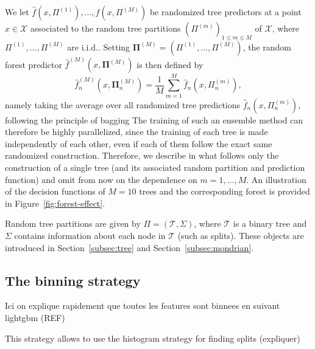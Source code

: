 \documentclass{article}
\makeatletter
\renewcommand{\leq}{\leqslant}
\renewcommand{\geq}{\geqslant}
\newcommand{\cX}{\mathcal X}
\newcommand{\iid}{i.i.d.\@\xspace}
\newcommand{\splits}{\Sigma} %
\newcommand{\tree}{\mathcal{T}} %
\newcommand{\nbtrees}{M} %
\makeatother
\begin{document}
We let $\widehat f(x, \Pi^{(1)}), \dots, \widehat f(x, \Pi^{(M)})$ be randomized tree predictors at a point $x \in \cX$ associated to the random tree partitions $(\Pi^{(m)})_{1 \leq m \leq M}$  of $\cX$, where $\Pi^{(1)}, \hdots , \Pi^{(M)}$ are \iid.
Setting $\boldsymbol \Pi^{(M)} = (\Pi^{(1)}, \ldots, \Pi^{(M)})$, the random forest predictor $\widehat f^{(\nbtrees)}(x, \boldsymbol \Pi^{(M)})$ is then defined by
\begin{equation}
    \label{eq:def_RF}
    \widehat f_n^{(M)}(x, \boldsymbol \Pi_n^{(M)}) = \frac 1M \sum_{m=1}^M \widehat f_n(x, \Pi_n^{(m)}),
\end{equation}
namely taking the average over all randomized tree predictions $\widehat f_n(x, \Pi_n^{(m)})$, following the principle of bagging  
The training of such an ensemble method can therefore be highly parallelized, since the training of each tree is made independently of each other, even if each of them follow the exact same randomized construction.
Therefore, we describe in what follows only the construction of a single tree (and its associated random partition and prediction function) and omit from now on the dependence on $m=1, \ldots, M$.
An illustration of the decision functions of $M=10$ trees and the corresponding forest is provided in Figure~\ref{fig:forest-effect}. 


Random tree partitions are given by $\Pi = (\tree, \splits)$, where $\tree$ is a binary tree and $\Sigma$ contains information about each node in $\tree$ (such as splits).
These objects are introduced in Section~\ref{subsec:tree} and Section~\ref{subsec:mondrian}.


\subsection{The binning strategy}
\label{subsec:binning}

Ici on explique rapidement que toutes les features sont binnees en suivant lightgbm (REF)


This strategy allows to use the histogram strategy for finding splits (expliquer)
\end{document}
